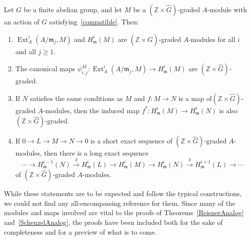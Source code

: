 \documentclass[ALCO,ThmDefs,Unicode]{cedram}
\DeclareMathOperator{\Ext}{Ext}
\newcommand{\ZZ}{{\mathbb Z}}
\newcommand{\mideal}{\ensuremath{\mathfrak{m}}}
\newcommand*{\alphenumi}{\renewcommand*{\theenumi}{\alph{enumi}}}
\begin{document}
\begin{prop}\label{extcohograding}
Let $G$ be a finite abelian group, and let $M$ be a $(\ZZ\times\hat{G})$-graded $A$-module with an action of $G$ satisfying~\eqref{compatible}. Then:
\begin{enumerate}%
\item \label{2.1.a} $\Ext_A^i(A/\mideal_j, M)$ and $H_\mideal^i(M)$ are $(\ZZ\times\hat{G})$-graded $A$-modules for all $i$ and all $j\ge 1$.
\item \label{2.1.b} The canonical maps $\psi_{i, j}^M:\Ext_A^i(A/\mideal_j, M)\to H_\mideal^i(M)$ are $(\ZZ\times\hat{G})$-graded.
\item \label{2.1.c} If $N$ satisfies the same conditions as $M$ and $f:M\to N$ is a map of\linebreak $(\ZZ\times\hat{G})$-graded $A$-modules, then the induced map $f^*:H_\mideal^i(M)\to H_\mideal^i(N)$ is also $(\ZZ\times\hat{G})$-graded.
\item \label{2.1.d} If $0\to L\to M\to N\to 0$ is a short exact sequence of $(\ZZ\times\hat{G})$-graded $A$-modules, then there is a long exact sequence
\[
\cdots\to H_\mideal^{i-1}(N)\xrightarrow{\delta} H_\mideal^i(L)\to H_\mideal^i(M)\to H_\mideal^i(N)
\xrightarrow{\delta} H_\mideal^{i+1}(L)\to\cdots
\]
of $(\ZZ\times\hat{G})$-graded $A$-modules.
\end{enumerate}
\end{prop}

\begin{rema}
While these statements are to be expected and follow the typical constructions, we could not find any all-encompassing reference for them. Since many of the modules and maps involved are vital to the proofs of Theorems~\ref{ReisnerAnalog} and~\ref{SchenzelAnalog}, the proofs have been included both for the sake of completeness and for a preview of what is to come.
\end{rema}
\end{document}
